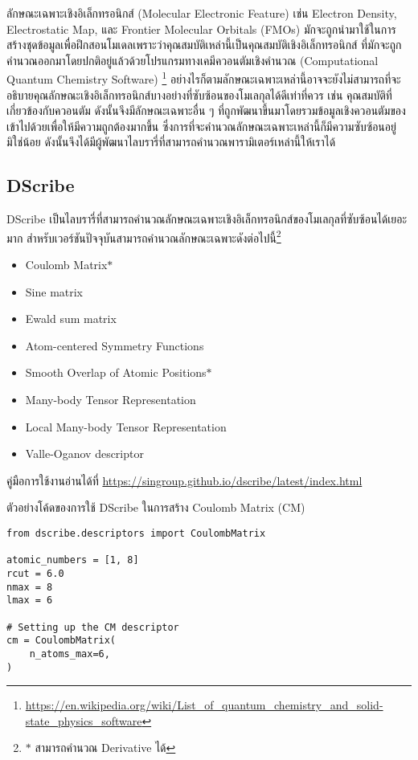 ลักษณะเฉพาะเชิงอิเล็กทรอนิกส์ (Molecular Electronic Feature) เช่น Electron Density, Electrostatic Map, และ Frontier 
Molecular Orbitals (FMOs) มักจะถูกนำมาใช้ในการสร้างชุดข้อมูลเพื่อฝึกสอนโมเดลเพราะว่าคุณสมบัติเหล่านี้เป็นคุณสมบัติเชิงอิเล็กทรอนิกส์%
ที่มักจะถูกคำนวณออกมาโดยปกติอยู่แล้วด้วยโปรแกรมทางเคมีควอนตัมเชิงคำนวณ (Computational Quantum Chemistry Software)%
\footnote{\url{https://en.wikipedia.org/wiki/List_of_quantum_chemistry_and_solid-state_physics_software}}
อย่างไรก็ตามลักษณะเฉพาะเหล่านี้อาจจะยังไม่สามารถที่จะอธิบายคุณลักษณะเชิงอิเล็กทรอนิกส์บางอย่างที่ซับซ้อนของโมเลกุลได้ดีเท่าที่ควร เช่น 
คุณสมบัติที่เกี่ยวข้องกับควอนตัม ดังนั้นจึงมีลักษณะเฉพาะอื่น ๆ ที่ถูกพัฒนาขึ้นมาโดยรวมข้อมูลเชิงควอนตัมของเข้าไปด้วยเพื่อให้มีความถูกต้องมากขึ้น 
ซึ่งการที่จะคำนวณลักษณะเฉพาะเหล่านี้ก็มีความซับซ้อนอยู่มิใช่น้อย ดังนั้นจึงได้มีผู้พัฒนาไลบรารี่ที่สามารถคำนวณพารามิเตอร์เหล่านี้ให้เราได้

\subsection{DScribe}

DScribe เป็นไลบรารี่ที่สามารถคำนวณลักษณะเฉพาะเชิงอิเล็กทรอนิกส์ของโมเลกุลที่ซับซ้อนได้เยอะมาก\autocite{himanen2020}
สำหรับเวอร์ชันปัจจุบันสามารถคำนวณลักษณะเฉพาะดังต่อไปนี้\footnote{$\ast$ สามารถคำนวณ Derivative ได้}

\begin{itemize}
    \item Coulomb Matrix$\ast$
    \item Sine matrix
    \item Ewald sum matrix
    \item Atom-centered Symmetry Functions
    \item Smooth Overlap of Atomic Positions$\ast$
    \item Many-body Tensor Representation
    \item Local Many-body Tensor Representation
    \item Valle-Oganov descriptor
\end{itemize}

คู่มือการใช้งานอ่านได้ที่ \url{https://singroup.github.io/dscribe/latest/index.html}

\noindent ตัวอย่างโค้ดของการใช้ DScribe ในการสร้าง Coulomb Matrix (CM)

\begin{lstlisting}[style=MyPython]
from dscribe.descriptors import CoulombMatrix

atomic_numbers = [1, 8]
rcut = 6.0
nmax = 8
lmax = 6

# Setting up the CM descriptor
cm = CoulombMatrix(
    n_atoms_max=6,
)
\end{lstlisting}

